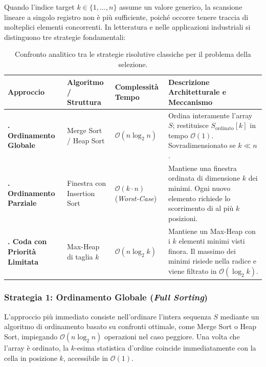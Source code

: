 Quando l'indice target $k \in \{1, \dots, n\}$ assume un valore generico, la scansione lineare a singolo registro non è più sufficiente, poiché occorre tenere traccia di molteplici elementi concorrenti. In letteratura e nelle applicazioni industriali si distinguono tre strategie fondamentali:

\begin{table}[H]
  \centering
  \caption{Confronto analitico tra le strategie risolutive classiche per il problema della selezione.}
  \label{tab:selection-strategies-comparison}
  \begin{tabularx}{\textwidth}{@{}>{\bfseries\arraybackslash}p{}p{}p{}Y@{}}
    \toprule
    Approccio & Algoritmo / Struttura & Complessità Tempo & Descrizione Architetturale e Meccanismo \\
    . Ordinamento Globale & Merge Sort / Heap Sort & $\mathcal{O}(n \log_2 n)$ & Ordina interamente l'array $S$; restituisce $S_{\text{ordinato}}[k]$ in tempo $\mathcal{O}(1)$. Sovradimensionato se $k \ll n$. \\
    . Ordinamento Parziale & Finestra con Insertion Sort & $\mathcal{O}(k \cdot n)$ \newline (\textit{Worst-Case}) & Mantiene una finestra ordinata di dimensione $k$ dei minimi. Ogni nuovo elemento richiede lo scorrimento di al più $k$ posizioni. \\
    . Coda con Priorità Limitata & Max-Heap di taglia $k$ & $\mathcal{O}(n \log_2 k)$ & Mantiene un Max-Heap con i $k$ elementi minimi visti finora. Il massimo dei minimi risiede nella radice e viene filtrato in $\mathcal{O}(\log_2 k)$. \\
    \bottomrule
  \end{tabularx}
\end{table}

\subsubsection{Strategia 1: Ordinamento Globale (\textit{Full Sorting})}
L'approccio più immediato consiste nell'ordinare l'intera sequenza $S$ mediante un algoritmo di ordinamento basato su confronti ottimale, come Merge Sort o Heap Sort, impiegando $\mathcal{O}(n \log_2 n)$ operazioni nel caso peggiore. Una volta che l'array è ordinato, la $k$-esima statistica d'ordine coincide immediatamente con la cella in posizione $k$, accessibile in $\mathcal{O}(1)$.


